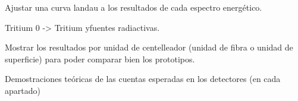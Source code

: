 Ajustar una curva landau a los resultados de cada espectro energético.

Tritium 0 -> Tritium yfuentes radiactivas.

Mostrar los resultados por unidad de centelleador (unidad de fibra o unidad de superficie) para poder comparar bien los prototipos.

Demostraciones teóricas de las cuentas esperadas en los detectores (en cada apartado)
